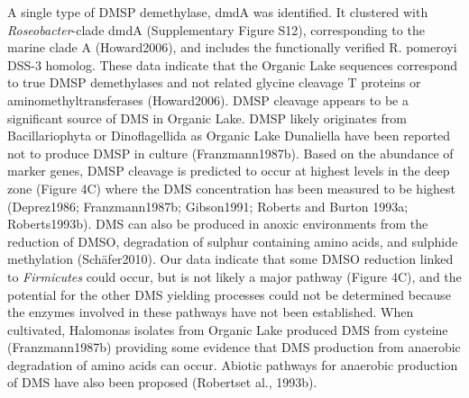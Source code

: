 {{A single type of \ac{DMSP} demethylase, dmdA was identified. It clustered with \emph{Roseobacter}-clade dmdA (Supplementary Figure S12), corresponding to the marine clade A (Howard2006), and includes the functionally verified R. pomeroyi DSS-3 homolog. These data indicate that the Organic Lake sequences correspond to true \ac{DMSP} demethylases and not related glycine cleavage T proteins or aminomethyltransferases (Howard2006). 
DMSP cleavage appears to be a significant source of \ac{DMS} in Organic Lake. \ac{DMSP} likely originates from Bacillariophyta or Dinoflagellida as Organic Lake Dunaliella have been reported not to produce \ac{DMSP} in culture (Franzmann1987b). Based on the abundance of marker genes, \ac{DMSP} cleavage is predicted to occur at highest levels in the deep zone (Figure 4C) where the \ac{DMS} concentration has been measured to be highest (Deprez1986; Franzmann1987b; Gibson1991; Roberts and Burton 1993a; Roberts1993b). \ac{DMS} can also be produced in anoxic environments from the reduction of \ac{DMS}O, degradation of sulphur containing amino acids, and sulphide methylation (Schäfer2010). Our data indicate that some \ac{DMS}O reduction linked to \emph{Firmicutes} could occur, but is not likely a major pathway (Figure 4C), and the potential for the other \ac{DMS} yielding processes could not be determined because the enzymes involved in these pathways have not been established. When cultivated, Halomonas isolates from Organic Lake produced \ac{DMS} from cysteine (Franzmann1987b) providing some evidence that \ac{DMS} production from anaerobic degradation of amino acids can occur. Abiotic pathways for anaerobic production of \ac{DMS} have also been proposed (Robertset al., 1993b).

}}
